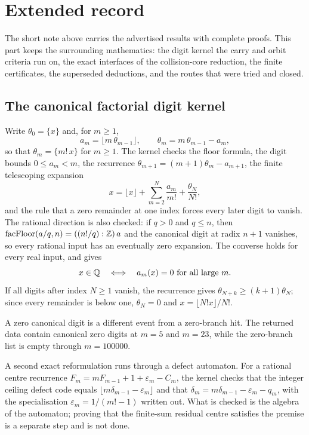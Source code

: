 \documentclass[11pt]{article}
\begin{document}
\section{Extended record}\label{long68:sec:extended-record}

The short note above carries the advertised results with complete proofs.
This part keeps the surrounding mathematics: the digit kernel the carry and
orbit criteria run on, the exact interfaces of the collision-core reduction,
the finite certificates, the superseded deductions, and the routes that were
tried and closed.

\subsection{The canonical factorial digit kernel}\label{long68:sec:ext-digits}

Write $\theta_0=\{x\}$ and, for $m\ge1$,
\[
 a_m=\lfloor m\,\theta_{m-1}\rfloor,\qquad \theta_m=m\,\theta_{m-1}-a_m ,
\]
so that $\theta_m=\{m!\,x\}$ for $m\ge1$.  The kernel checks the floor
formula, the digit bounds $0\le a_m<m$, the recurrence
$\theta_{m+1}=(m+1)\theta_m-a_{m+1}$, the finite telescoping expansion
\[
 x=\lfloor x\rfloor+\sum_{m=2}^{N}\frac{a_m}{m!}+\frac{\theta_N}{N!},
\]
and the rule that a zero remainder at one index forces every later digit to
vanish.  The rational direction is also checked: if $q>0$ and $q\le n$, then
$\operatorname{facFloor}(a/q,n)=((n!/q):\mathbb{Z})\,a$ and the canonical digit at
radix $n+1$ vanishes, so every rational input has an eventually zero
expansion.  The converse holds for every real input, and gives
\[
 x\in\Q\quad\Longleftrightarrow\quad a_m(x)=0\ \hbox{for all large }m .
\]
If all digits after index $N\ge1$ vanish, the recurrence gives
$\theta_{N+k}\ge(k+1)\theta_N$; since every remainder is below one,
$\theta_N=0$ and $x=\lfloor N!x\rfloor/N!$.

A zero canonical digit is a different event from a zero-branch hit.  The
returned data contain canonical zero digits at $m=5$ and $m=23$, while the
zero-branch list is empty through $m=100000$.

A second exact reformulation runs through a defect automaton.  For a rational
centre recurrence $F_m=mF_{m-1}+1+\varepsilon_m-C_m$, the kernel checks that
the integer ceiling defect code equals
$\lfloor m\delta_{m-1}-\varepsilon_m\rfloor$ and that
$\delta_m=m\delta_{m-1}-\varepsilon_m-q_m$, with the specialisation
$\varepsilon_m=1/(m!-1)$ written out.  What is checked is the algebra of the
automaton; proving that the finite-sum residual centre satisfies the premise
is a separate step and is not done.
\end{document}
